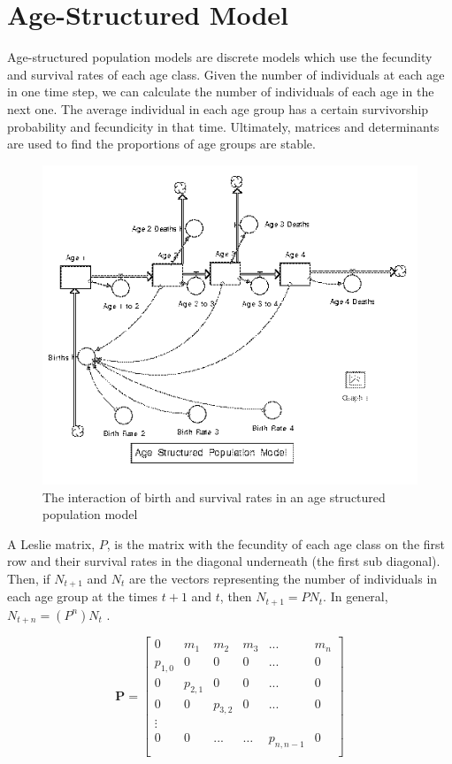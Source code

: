 \documentclass[12pt]{article}
\begin{document}
\section{Age-Structured Model}

Age-structured population models are discrete models which use the fecundity and survival rates of each age class. Given the number of individuals at each age in one time step, we can calculate the number of individuals of each age in the next one. The average individual in each age group has a certain survivorship probability and fecundicity in that time. Ultimately, matrices and determinants are used to find the proportions of age groups are stable. 
\begin{figure}[h!]
  \includegraphics[width=\linewidth]{img.PNG}
  \caption{The interaction of birth and survival rates in an age structured population model}
  \label{model}
\end{figure}

\newpage
A Leslie matrix, $P$, is the matrix with the fecundity of each age class on the first row and their survival rates in the diagonal underneath (the first sub diagonal). Then, if $N_{t+1}$ and $N_t$ are the vectors representing the number of individuals in each age group at the times $t+1$ and $t$, then $N_{t+1}=PN_t$. In general, $N_{t+n}=(P^n)N_t$ \cite{vandermeer_goldberg_2013}. 



\begin{equation*}
    \textbf{P}=
    \begin{bmatrix}
    0&m_1&m_2&m_3&...&m_n\\
    p_{1,0}&0&0&0&...&0\\
    0&p_{2,1}&0&0&...&0\\
    0&0&p_{3,2}&0&...&0\\
    \vdots\\
    0&0&...&\dots&p_{n,n-1}&0\\
    \end{bmatrix}
\end{equation*}
\end{document}

